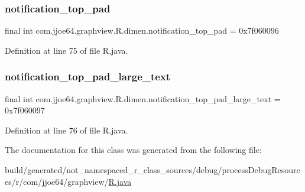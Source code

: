 \subsubsection{\texorpdfstring{notification\_top\_pad}{notification\_top\_pad}}
{\footnotesize\ttfamily final int com.\+jjoe64.\+graphview.\+R.\+dimen.\+notification\+\_\+top\+\_\+pad = 0x7f060096\hspace{0.3cm}{\ttfamily [static]}}



Definition at line 75 of file R.\+java.

\mbox{\label{classcom_1_1jjoe64_1_1graphview_1_1_r_1_1dimen_a1c92004b0b211cdd588c4dcbfdae0e85}} 
\subsubsection{\texorpdfstring{notification\_top\_pad\_large\_text}{notification\_top\_pad\_large\_text}}
{\footnotesize\ttfamily final int com.\+jjoe64.\+graphview.\+R.\+dimen.\+notification\+\_\+top\+\_\+pad\+\_\+large\+\_\+text = 0x7f060097\hspace{0.3cm}{\ttfamily [static]}}



Definition at line 76 of file R.\+java.



The documentation for this class was generated from the following file\+:\begin{DoxyCompactItemize}
\item 
build/generated/not\+\_\+namespaced\+\_\+r\+\_\+class\+\_\+sources/debug/process\+Debug\+Resources/r/com/jjoe64/graphview/\mbox{\hyperlink{com_2jjoe64_2graphview_2_r_8java}{R.\+java}}\end{DoxyCompactItemize}
